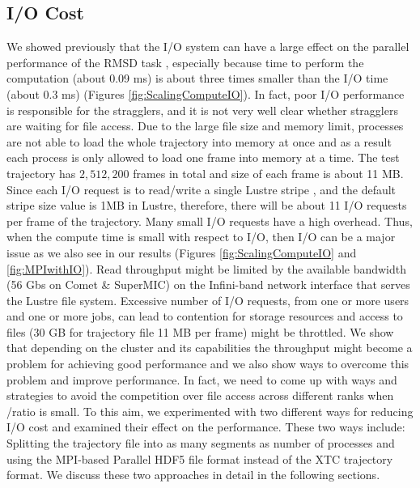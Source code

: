 \subsection{I/O Cost}
\label{I/O}
We showed previously that the I/O system can have a large effect on the parallel performance of the RMSD task \cite{Khoshlessan:2017ab},
especially because time to perform the computation \tcomp (about 0.09 ms) is about three times smaller than the I/O time \tIO (about 0.3 ms) (Figures \ref{fig:ScalingComputeIO}). 
In fact, poor I/O performance is responsible for the stragglers, and it is not very well clear whether stragglers are waiting for file access. 
Due to the large file size and memory limit, processes are not able to load the whole trajectory into memory at once and as a result each process is only allowed to load one frame into memory at a time.
The test trajectory has $2,512,200$ frames in total and size of each frame is about 11 MB.
Since each I/O request is to read/write a single Lustre stripe \cite{optimize_lustre}, and the default stripe size value is 1MB in Lustre, therefore, there will be about 11 I/O requests per frame of the trajectory.
Many small I/O requests have a high overhead. 
Thus, when the compute time is small with respect to I/O, then I/O can be a major issue as we also see in our results (Figures \ref{fig:ScalingComputeIO} and \ref{fig:MPIwithIO}).    
Read throughput might be limited by the available bandwidth (56 Gbs on Comet \& SuperMIC) on the Infini-band network interface that serves the Lustre file system.
Excessive number of I/O requests, from one or more users and one or more jobs, can lead to contention for storage resources and access to files (30 GB for trajectory file 11 MB per frame) might be throttled.
We show that depending on the cluster and its capabilities the throughput might become a problem for achieving good performance and we also show ways to overcome this problem and improve performance.
In fact, we need to come up with ways and strategies to avoid the competition over file access across different ranks when \tcomp/\tIO ratio is small.
To this aim, we experimented with two different ways for reducing I/O cost and examined their effect on the performance.
These two ways include: Splitting the trajectory file into as many segments as number of processes and using the MPI-based Parallel HDF5 file format instead of the XTC trajectory format.
We discuss these two approaches in detail in the following sections.

